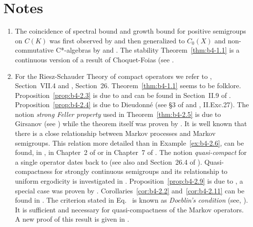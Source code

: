\section*{Notes}
\begin{enumerate}[label=\emph{Section \arabic*:}, wide, itemsep=1ex]

\item
 The coincidence of spectral bound and growth bound for positive semigroups on $C(K)$ was first observed by \textcite{derndinger:1980} and then generalized to $C_0(X)$ and non-commutative C*-algebras by \textcite{battydavies:1983} and \textcite{grohneubrander:1981}. 
The stability Theorem~\ref{thm:b4-1.1} is a continuous version of a result of Choquet-Foias (see 
\textcite[V.8.8]{schaefer:1974}.

\item
 For the Riesz-Schauder Theory of compact operators we refer to \textcite{dunfordschwartz:1958}, Section~VII.4 and \textcite{pietsch:1978}, Section~26. 
Theorem~\ref{thm:b4-1.1} seems to be folklore. Proposition~\ref{prop:b4-2.3} is due to \textcite{grothendieck:1953} and can be found in Section~II.9 of \textcite{schaefer:1974}. Proposition~\ref{prop:b4-2.4} is due to Dieudonné (see §3 of \textcite{grothendieck:1953} and \textcite{schaefer:1974}, II.Exc.27). The notion \emph{strong Feller property} used in Theorem~\ref{thm:b4-2.5} is due to Girsanov (see \textcite{dynkin:1965}) while the theorem itself was proven by \textcite{davies:1982}. 
It is well known that there is a close relationship between Markov processes and Markov semigroups. 
This relation more detailed than in Example~\ref{ex:b4-2.6}, can be found, \eg in \textcite{dynkin:1965}, in Chapter~2 of \textcite{vancasteren:1985} or in Chapter~7 of \textcite{lamperti:1977}. 
The notion \emph{quasi-compact} for a single operator dates back to \textcite{eberlein:1948} (see also \textcite{yosidakakutani:1941} and Section~26.4 of \textcite{pietsch:1978}). 
Quasi-compactness for strongly continuous semigroups and its relationship to uniform ergodicity is investigated in \textcite{lin:1975}. 
Proposition~\ref{prop:b4-2.9} is due to \textcite{voigt:1980}, a special case was proven by \textcite{vidav:1970}. 
Corollaries~\ref{cor:b4-2.2} and~\ref{cor:b4-2.11} can be found in   \textcite{greiner:1984}.
The criterion stated in Eq.~ is known as \emph{Doeblin's condition} (see, \eg \textcite{yosidakakutani:1941}). It is sufficient and
necessary for quasi-compactness of the Markov operators. 
A new proof of this result is given in \textcite{lotz:1981}.


\end{enumerate}
